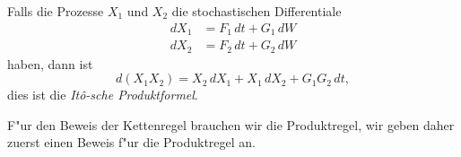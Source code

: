 \begin{satz}
Falls die Prozesse $X_1$ und $X_2$ die stochastischen Differentiale
\begin{align*}
dX_1
&=
F_1\,dt + G_1\,dW
\\
dX_2
&=
F_2\,dt + G_2\,dW
\end{align*}
haben, dann ist
\begin{equation}
d(X_1X_2)
=
X_2\,dX_1 + X_1\,dX_2 + G_1G_2\,dt,
\label{stochastisch:ito-produkt}
\end{equation}
dies ist die {\em It\^o-sche Produktformel}.
\end{satz}

F"ur den Beweis der Kettenregel brauchen wir die Produktregel, wir geben
daher zuerst einen Beweis f"ur die Produktregel an.

